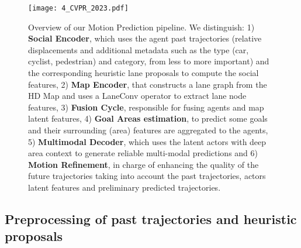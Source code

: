 \begin{figure}[h] 
	\centering
	\texttt{[image: 4\_CVPR\_2023.pdf]}
	\caption[Overview of our Motion Prediction model including Fusion Cycle, Heuristic Proposals and Motion Refinement]{Overview of our Motion Prediction pipeline. We distinguish: 1) \textbf{Social Encoder}, which uses the agent past trajectories (relative displacements and additional metadata such as the type (\eg car, cyclist, pedestrian) and category, from less to more important) and the corresponding heuristic lane proposals to compute the social features, 2) \textbf{Map Encoder}, that constructs a lane graph from the HD Map and uses a LaneConv operator \cite{liang2020learning} to extract lane node features, 3) \textbf{Fusion Cycle}, responsible for fusing agents and map latent features, 4) \textbf{Goal Areas estimation}, to predict some goals and their surrounding  (area) features are aggregated to the agents, 5) \textbf{Multimodal Decoder}, which uses the latent actors with deep area context to generate reliable multi-modal predictions and 6) \textbf{Motion Refinement}, in charge of enhancing the quality of the future trajectories taking into account the past trajectories, actors latent features and preliminary predicted trajectories.}
	\label{fig:4_CVPR_2023}
\end{figure}

\subsection{Preprocessing of past trajectories and heuristic proposals}
\label{subsec:4_improving_efficiency_preprocessing}

